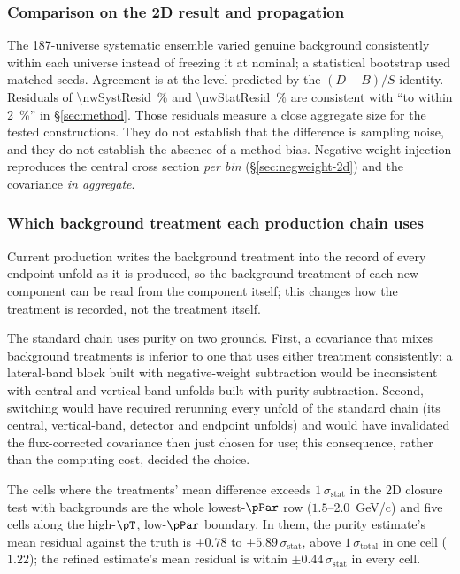 \subsubsection{Comparison on the 2D result and propagation}

The 187-universe systematic ensemble varied genuine background consistently within each universe instead of freezing it at nominal; a statistical bootstrap used matched seeds. Agreement is at the level predicted by the $(D-B)/S$ identity. Residuals of \SI{\nwSystResid}{\percent} and \SI{\nwStatResid}{\percent} are consistent with ``to within \SI{2}{\percent}'' in \S\ref{sec:method}. Those residuals measure a close aggregate size for the tested constructions. They do not establish that the difference is sampling noise, and they do not establish the absence of a method bias. Negative-weight injection reproduces the central cross section \emph{per bin} (\S\ref{sec:negweight-2d}) and the covariance \emph{in aggregate}.

\subsubsection{Which background treatment each production chain uses}

Current production writes the background treatment into the record of every endpoint unfold as it is produced, so the background treatment of each new component can be read from the component itself; this changes how the treatment is recorded, not the treatment itself.

The standard chain uses purity on two grounds. First, a covariance that mixes background treatments is inferior to one that uses either treatment consistently: a lateral-band block built with negative-weight subtraction would be inconsistent with central and vertical-band unfolds built with purity subtraction. Second, switching would have required rerunning every unfold of the standard chain (its central, vertical-band, detector and endpoint unfolds) and would have invalidated the flux-corrected covariance then just chosen for use; this consequence, rather than the computing cost, decided the choice.

The cells where the treatments' mean difference exceeds $1\,\sigma_{\mathrm{stat}}$ in the 2D closure test with backgrounds are the whole lowest-$\pPar$ row ($1.5$--\SI{2.0}{GeV/c}) and five cells along the high-$\pT$, low-$\pPar$ boundary. In them, the purity estimate's mean residual against the truth is $+0.78$ to $+5.89\,\sigma_{\mathrm{stat}}$, above $1\,\sigma_{\mathrm{total}}$ in one cell ($1.22$); the refined estimate's mean residual is within $\pm0.44\,\sigma_{\mathrm{stat}}$ in every cell.

